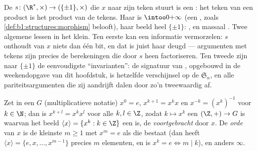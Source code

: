 \begin{example}\label{ex:b1:structures:signmorphism}
De  $s \colon (\R^*, \times) \to (\{\pm1\}, \times)$ die $x$
naar zijn teken stuurt is een : het teken van een product is het
product van de tekens. Haar  is $\intoo0{+\infty}$ (een ,
zoals \cref{def:b1:structures:morphism} belooft), haar beeld heel
$\{\pm1\}$: , en massaal . Twee algemene lessen in
het klein. Ten eerste kan een  informatie vermorzelen: $s$
onthoudt van $x$ niets dan één bit, en dat is juist haar deugd ---
argumenten met tekens zijn precies de berekeningen die door $s$ heen
factoriseren. Ten tweede zijn  naar $\{\pm1\}$ de eenvoudigste
``invarianten'': de signatuur van , opgebouwd in de
weekendopgave van dit hoofdstuk, is hetzelfde verschijnsel op de 
$\mathfrak S_n$, en alle pariteitsargumenten die zij aandrijft dalen door
zo'n tweewaardig  af.
\end{example}

\begin{definition}\label{def:b1:structures:order}
Zet in een  $G$ (multiplicatieve notatie) $x^0 = e$, $x^{k+1} = x^k
x$ en $x^{-k} = (x^k)^{-1}$ voor $k \in \N$; dan is $x^{k+l} = x^k x^l$
voor alle $k, l \in \Z$, zodat $k \mapsto x^k$ een  $(\Z, +) \to
G$ is waarvan het beeld $\langle x \rangle = \{x^k : k \in \Z\}$ een
 is, de  \emph{voortgebracht} door $x$. De
\emph{orde} van $x$ is de kleinste $m \geq 1$
met $x^m = e$ als die bestaat (dan heeft $\langle x\rangle = \{e, x,
\dots, x^{m-1}\}$ precies $m$ elementen, en is $x^k = e \iff m \mid k$),
en anders $\infty$.
\end{definition}

